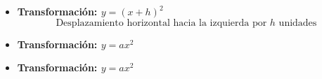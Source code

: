     \begin{itemize}
        \item \textbf{Transformación: \(y = (x + h)^2\)}
        \[
        \text{Desplazamiento horizontal hacia la izquierda por } h \text{ unidades}
        \]
            
            
            
        \item \textbf{Transformación: \(y = ax^2\)}
            
            
            
            
        \item \textbf{Transformación: \(y = ax^2\)}
            

\end{itemize}
